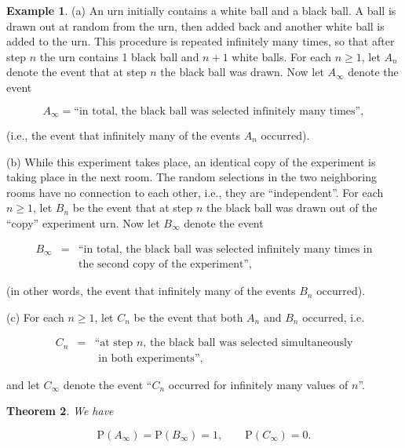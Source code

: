 \documentclass[11pt]{report}
\theoremstyle{plain}
\newtheorem{thm}{Theorem}[chapter]
\theoremstyle{definition}
\newtheorem{example}[thm]{Example}
\begin{document}
\begin{example}
(a) An urn initially contains a white ball and a
black ball. A ball is drawn out at random from the
urn, then added back and another white ball is added
to the urn. This procedure is repeated infinitely many
times, so that after step $n$ the urn contains 1
black ball and $n+1$ white balls. For each $n\ge1$,
let $A_n$ denote the event that at step $n$ the black
ball was drawn. Now let $A_\infty$ denote the event

\[
A_\infty = \textrm{``in total, the black ball was selected infinitely many times''},
\]

(i.e., the event that infinitely many of the events
$A_n$ occurred).

(b) While this experiment takes place, an identical
copy of the experiment is taking place in the next
room. The random selections in the two neighboring
rooms have no connection to each other, i.e., they are
``independent''. For each $n\ge 1$, let $B_n$ be the
event that at step $n$ the black ball was drawn out
of the ``copy'' experiment urn. Now let $B_\infty$
denote the event

\begin{eqnarray*}
B_\infty &=& \textrm{``in total, the black ball was selected infinitely many times in}\\&&
\textrm{the second copy of the experiment''},
\end{eqnarray*}

(in other words, the event that infinitely many of
the events $B_n$ occurred).

(c) For each $n\ge 1$, let $C_n$ be the event that
both $A_n$ and $B_n$ occurred, i.e.

\begin{eqnarray*}
C_n &=& \textrm{``at step $n$, the black ball was selected simultaneously}
\\&& \textrm{ in both experiments'',}
\end{eqnarray*}

and let $C_\infty$ denote the event ``$C_n$ occurred
for infinitely many values of $n$''.
\end{example}

\begin{thm}
We have

\[
\mathrm{P}(A_\infty) = \mathrm{P}(B_\infty) = 1, \qquad \mathrm{P}(C_\infty) = 0.
\]

\end{thm}
\end{document}
